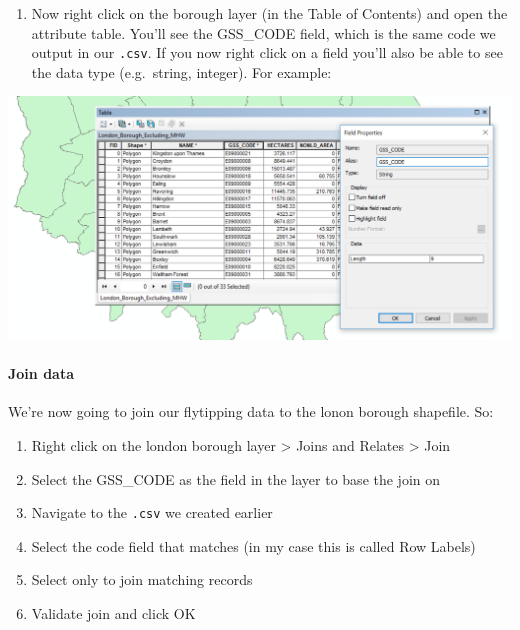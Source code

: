 \documentclass[]{book}
\providecommand{\tightlist}{%
  \setlength{\itemsep}{0pt}\setlength{\parskip}{0pt}}
\let\oldparagraph\paragraph
\renewcommand{\paragraph}[1]{\oldparagraph{#1}\mbox{}}
\begin{document}
\begin{enumerate}
\def\labelenumi{\arabic{enumi}.}
\setcounter{enumi}{6}
\tightlist
\item
  Now right click on the borough layer (in the Table of Contents) and open the attribute table. You'll see the GSS\_CODE field, which is the same code we output in our \texttt{.csv}. If you now right click on a field you'll also be able to see the data type (e.g.~string, integer). For example:
\end{enumerate}

\begin{center}\includegraphics[width=500pt]{prac1_images/London_attribute_table} \end{center}

\hypertarget{join-data}{%
\paragraph{Join data}\label{join-data}}

We're now going to join our flytipping data to the lonon borough shapefile. So:

\begin{enumerate}
\def\labelenumi{\arabic{enumi}.}
\setcounter{enumi}{7}
\tightlist
\item
  Right click on the london borough layer \textgreater{} Joins and Relates \textgreater{} Join\\
\item
  Select the GSS\_CODE as the field in the layer to base the join on
\item
  Navigate to the \texttt{.csv} we created earlier
\item
  Select the code field that matches (in my case this is called Row Labels)
\item
  Select only to join matching records
\item
  Validate join and click OK
\end{enumerate}
\end{document}
